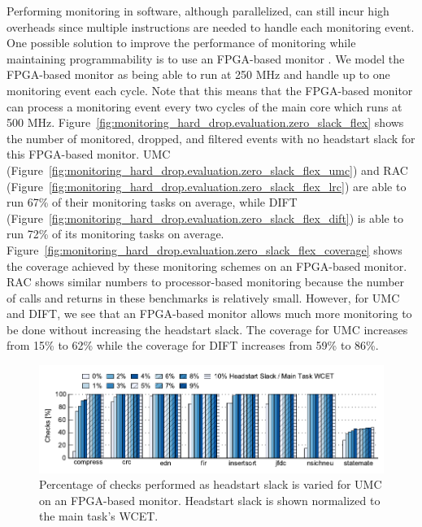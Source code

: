 Performing monitoring in software, although parallelized, can still incur high
overheads since multiple instructions are needed to handle each monitoring
event. One possible solution to improve the performance of monitoring while
maintaining programmability is to use an FPGA-based monitor
\cite{flexcore-micro10}. We model the FPGA-based monitor as being able to run
at 250 MHz and handle up to one monitoring event each cycle. Note that this
means that the FPGA-based monitor can process a monitoring event every two
cycles of the main core which runs at 500 MHz.
Figure~\ref{fig:monitoring_hard_drop.evaluation.zero_slack_flex} shows the
number of monitored, dropped, and filtered events with no headstart slack for
this FPGA-based monitor. UMC
(Figure~\ref{fig:monitoring_hard_drop.evaluation.zero_slack_flex_umc}) and RAC
(Figure~\ref{fig:monitoring_hard_drop.evaluation.zero_slack_flex_lrc}) are able
to run 67\% of their monitoring tasks on average, while DIFT
(Figure~\ref{fig:monitoring_hard_drop.evaluation.zero_slack_flex_dift}) is able
to run 72\% of its monitoring tasks on average.
Figure~\ref{fig:monitoring_hard_drop.evaluation.zero_slack_flex_coverage} shows
the coverage achieved by these monitoring schemes on an FPGA-based monitor. RAC
shows similar numbers to processor-based monitoring because the number of calls
and returns in these benchmarks is relatively small. However, for UMC and DIFT,
we see that an FPGA-based monitor allows much more monitoring to be done
without increasing the headstart slack. The coverage for UMC increases from
15\% to 62\% while the coverage for DIFT increases from 59\% to 86\%.

\begin{figure}
  \begin{center}
    \includegraphics{monitoring_hard_drop/data/flex_umc_sweep.pdf}
    \caption{Percentage of checks performed as headstart slack is varied for
    UMC on an FPGA-based monitor. Headstart slack is shown normalized to the
    main task's WCET.}
    \label{fig:monitoring_hard_drop.evaluation.flex_umc_sweep}
  \end{center}
\end{figure}

